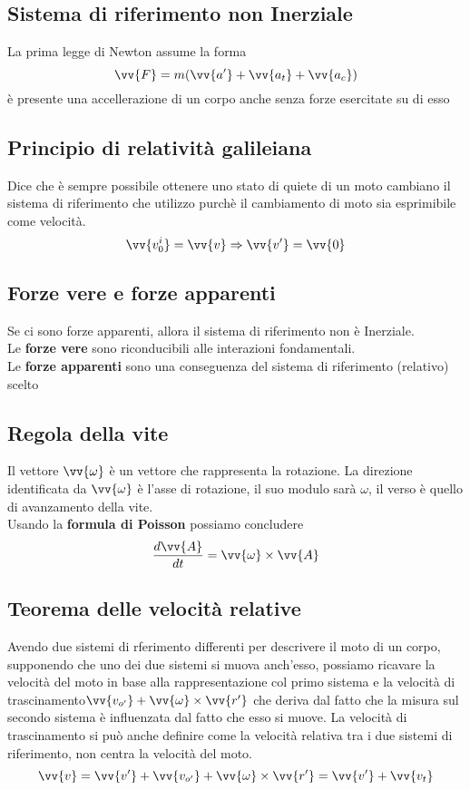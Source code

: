 \documentclass[a4paper]{report}
\begin{document}
  \subsection{Sistema di riferimento non Inerziale}
  La prima legge di Newton assume la forma
  $$ \vv{F} = m(\vv{a'} + \vv{a_t} + \vv{a_c}) $$
  è presente una accellerazione di un corpo anche senza forze esercitate su di esso
  \subsection{Principio di relatività galileiana}
  Dice che è sempre possibile ottenere uno stato di quiete di un moto cambiano il sistema di riferimento che utilizzo purchè il cambiamento di moto sia esprimibile come velocità.
  $$\vv{v_0^i} = \vv{v} \Rightarrow \vv{v'} = \vv{0}$$

  \subsection{Forze vere e forze apparenti}
  Se ci sono forze apparenti, allora il sistema di riferimento non è Inerziale. \\
  Le \textbf{forze vere} sono riconducibili alle interazioni fondamentali.\\
  Le \textbf{forze apparenti} sono una conseguenza del sistema di riferimento (relativo) scelto
  \subsection{Regola della vite}
  Il vettore $\vv{\omega}$ è un vettore che rappresenta la rotazione. La direzione identificata da $\vv{\omega}$ è l'asse di rotazione, il suo modulo sarà $\omega$, il verso è quello di avanzamento della vite.\\
  Usando la \textbf{formula di Poisson} possiamo concludere
  $$\frac{d\vv{A}}{dt} = \vv{\omega} \times \vv{A}$$
  \subsection{Teorema delle velocità relative}
  Avendo due sistemi di rferimento differenti per descrivere il moto di un corpo, supponendo che uno dei due sistemi si muova anch'esso, possiamo ricavare la velocità del moto in base alla rappresentazione col primo sistema e la velocità di trascinamento$ \vv{v_{o'}} + \vv{\omega} \times \vv{r'}$ che deriva dal fatto che la misura sul secondo sistema è influenzata dal fatto che esso si muove. La velocità di trascinamento si può anche definire come la velocità relativa tra i due sistemi di riferimento, non centra la velocità del moto.
  $$ \vv{v} = \vv{v'} + \vv{v_{o'}} + \vv{\omega} \times \vv{r'} = \vv{v'} + \vv{v_t}$$
\end{document}
